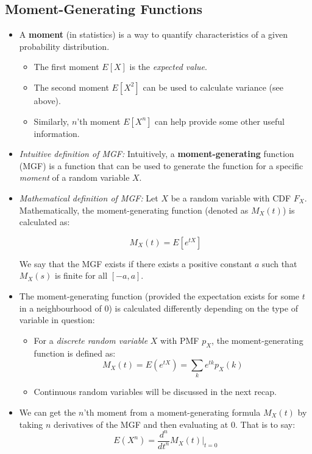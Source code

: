 \documentclass[12pt]{article}
\begin{document}
\subsection{Moment-Generating Functions}

\begin{itemize}
	\item A \textbf{moment} (in statistics) is a way to quantify characteristics of a given probability distribution.
	      \begin{itemize}
		      \item The first moment $E[X]$ is the \textit{expected value}.
		      \item The second moment $E[X^2]$ can be used to calculate variance (see above).
		      \item Similarly, $n$'th moment $E[X^n]$ can help provide some other useful information.
	      \end{itemize}
	\item \textit{Intuitive definition of MGF:} Intuitively, a
	      \textbf{moment-generating} function (MGF) is a function that can be
	      used to generate the function for a specific \textit{moment} of a
	      random variable $X$.
	\item \textit{Mathematical definition of MGF:} Let $X$ be a random variable
	      with CDF $F_X$. Mathematically, the moment-generating function (denoted
	      as $M_X(t)$) is calculated as:

	      \[
		      M_X(t) = E[e^{tX}]
	      \]

	      We say that the MGF exists if there exists a positive constant $a$
	      such that $M_X(s)$ is finite for all $[-a, a]$.

	\item The moment-generating function (provided the expectation exists for
	      some $t$ in a neighbourhood of $0$) is calculated differently depending
	      on the type of variable in question:
	      \begin{itemize}
		      \item For a \textit{discrete random variable} $X$ with PMF
		            $p_X$, the moment-generating function is defined as: \[
			            M_X(t) = E(e^{tX}) = \displaystyle\sum_{k} e^{tk}p_X(k)
		            \]
		      \item Continuous random variables will be discussed in the next recap.
	      \end{itemize}
	\item We can get the $n$'th moment from a moment-generating formula $M_X(t)$ by taking $n$ derivatives of the MGF and then evaluating at $0$. That is to say:
	      \[
		      E(X^n) = \frac{d^n}{dt^n} M_X(t)\Bigr\rvert_{t=0}
	      \]
\end{itemize}
\end{document}

